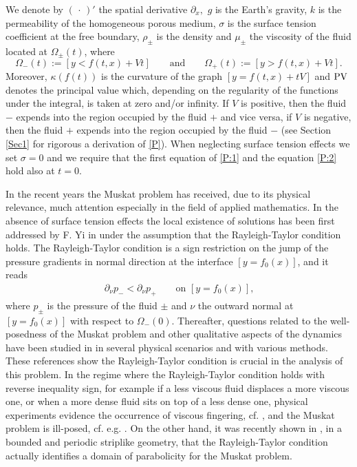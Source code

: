 \documentclass[11pt,reqno]{amsart}
\numberwithin{equation}{section}
\newcommand{\PV}{\mathop{\rm PV}\nolimits}
\newcommand{\0}{\Omega}
\newcommand{\p}{\partial}
\numberwithin{equation}{section}
\begin{document}
We denote by  $(\,\cdot\,)'$ the spatial derivative  $\p_x,$ 
  $g$ is the Earth's gravity, $k$ is   the permeability of the homogeneous porous medium, $\sigma$ is the surface tension coefficient at the free boundary,  
  $\rho_\pm$ is the density and   $\mu_\pm$  the viscosity of the fluid located at $\0_\pm(t)$,  where
\[ \0_-(t):=[y<f(t,x)+Vt]\qquad\text{and}\qquad \0_+(t):=[y>f(t,x)+Vt].\]
Moreover,  $\kappa(f(t))$ is the curvature of the graph $[y=f(t,x)+tV]$ and
$\PV$ denotes the principal value which, depending on the regularity of the functions under the integral, is taken at zero and/or infinity.
If    $V$ is positive, then the fluid  $-$ expends into the region occupied by the fluid $+$  and vice versa, if $V$ is negative, then the fluid  $+$ expends into the region occupied by the fluid $-$ 
(see Section \ref{Sec1} for rigorous a derivation of \eqref{P}). 
When neglecting  surface tension effects we set $\sigma=0$ and we require that the first equation of \eqref{P:1} and the equation \eqref{P:2} hold also at $t=0$.

In the recent years the Muskat problem has received, due to its physical relevance, much attention especially in the field of applied mathematics.
In the absence of surface tension effects the local  existence of solutions has been first addressed by F. Yi in \cite{Y96} under the assumption that the Rayleigh-Taylor condition holds.
The Rayleigh-Taylor condition \cite{ST58} is a sign restriction on the jump of the pressure gradients in normal direction at the interface  $[y=f_0(x)]$, and it reads
\begin{align}\label{RT}
 \p_\nu p_-< \p_\nu p_+ \qquad\text{on $[y=f_0(x)]$,}
\end{align}
where  $p_\pm$ is the pressure of the fluid $\pm$ and  $\nu$ the outward normal at $[y=f_0(x)]$ with respect to $\0_-(0)$.
Thereafter, questions related to the well-posedness of the Muskat problem  and other qualitative aspects of the  dynamics have been studied in
\cite{A04, BCG14, BCS16, BS16x, CGSV15x, CCG11, CCG13b, CG07, CG10, CGO14, CGCSS14x, SCH04, BV14, EMM12a, EM11a,  EMW15, M16x, CCGS13, GB14, CCFG13, CCFGL12, GG14, CGFL11,    GS14} in several physical scenarios and with 
various  methods.
These references show the Rayleigh-Taylor condition is crucial in the analysis of this problem.   
In the regime where the Rayleigh-Taylor condition  holds with reverse inequality sign, for example if a less viscous fluid displaces a more viscous one, or when a more dense fluid sits on top of a less dense one, physical experiments evidence  
the occurrence of  viscous fingering, cf. \cite{H87, ST58}, and the Muskat problem is ill-posed, cf. e.g. \cite{SCH04, EM11a, CG07}. 
On the other hand, it  was recently shown in \cite{EMW15}, in a  bounded and periodic striplike geometry, that the Rayleigh-Taylor condition actually
identifies   a domain of parabolicity for the Muskat problem. 
\end{document}
